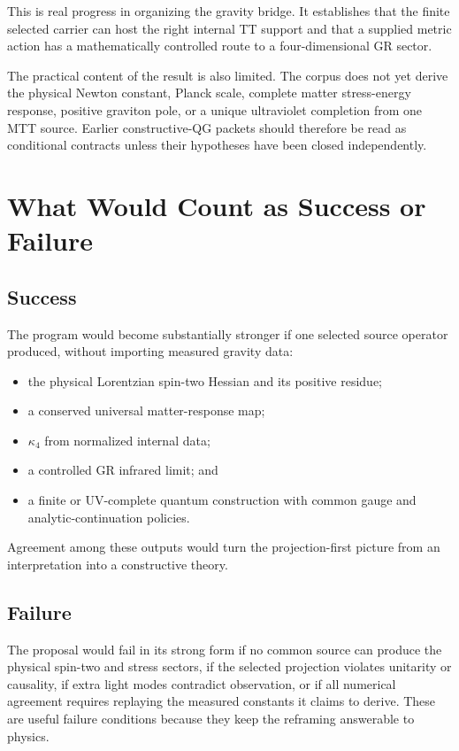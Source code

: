 \documentclass[11pt]{article}
\begin{document}
This is real progress in organizing the gravity bridge.  It establishes that
the finite selected carrier can host the right internal TT support and that a
supplied metric action has a mathematically controlled route to a
four-dimensional GR sector.

The practical content of the result is also limited.  The corpus does not yet
derive the physical Newton constant, Planck scale, complete matter
stress-energy response, positive graviton pole, or a unique ultraviolet
completion from one MTT source.  Earlier constructive-QG packets should
therefore be read as conditional contracts unless their hypotheses have been
closed independently.

\section{What Would Count as Success or Failure}

\subsection{Success}

The program would become substantially stronger if one selected source
operator produced, without importing measured gravity data:
\begin{itemize}
\item the physical Lorentzian spin-two Hessian and its positive residue;
\item a conserved universal matter-response map;
\item \(\kappa_4\) from normalized internal data;
\item a controlled GR infrared limit; and
\item a finite or UV-complete quantum construction with common gauge and
analytic-continuation policies.
\end{itemize}
Agreement among these outputs would turn the projection-first picture from an
interpretation into a constructive theory.

\subsection{Failure}

The proposal would fail in its strong form if no common source can produce
the physical spin-two and stress sectors, if the selected projection violates
unitarity or causality, if extra light modes contradict observation, or if
all numerical agreement requires replaying the measured constants it claims
to derive.  These are useful failure conditions because they keep the
reframing answerable to physics.
\end{document}
